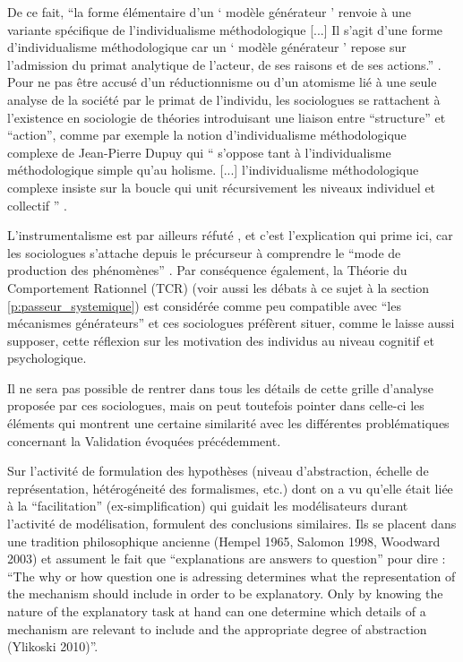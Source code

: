 De ce fait, \enquote{la forme élémentaire d’un \enquote{ modèle générateur } renvoie à une variante spécifique de l’individualisme méthodologique [...] Il s’agit d’une forme d’individualisme méthodologique car un  \enquote{ modèle générateur } repose sur l’admission du primat analytique de l’acteur, de ses raisons et de ses actions.} \autocite{Manzo2007}. Pour ne pas être accusé d'un réductionnisme ou d'un atomisme lié à une seule analyse de la société par le primat de l'individu, les sociologues se rattachent à l'existence en sociologie de théories introduisant une liaison entre \enquote{structure} et \enquote{action}, comme par exemple la notion d'individualisme méthodologique complexe de Jean-Pierre Dupuy \autocite{Dupuy2004} qui \enquote{ s’oppose tant à l’individualisme méthodologique simple qu’au holisme. [...] l’individualisme méthodologique complexe insiste sur la boucle qui unit récursivement les niveaux individuel et collectif } \autocite[9]{Manzo2007}.

L'instrumentalisme est par ailleurs réfuté  \autocite{Hedstrom2010}, et c'est l'explication qui prime ici, car les sociologues s'attache depuis le précurseur \textcite{Harre1972} à comprendre le \enquote{mode de production des phénomènes} . Par conséquence également, la Théorie du Comportement Rationnel (TCR) (voir aussi les débats à ce sujet à la section \ref{p:passeur_systemique}) est considérée comme peu compatible avec \enquote{les mécanismes générateurs} et ces sociologues préfèrent situer, comme \textcite{Conte2007} le laisse aussi supposer, cette réflexion sur les motivation des individus au niveau cognitif et psychologique.

Il ne sera pas possible de rentrer dans tous les détails de cette grille d'analyse proposée par ces sociologues, mais on peut toutefois pointer dans celle-ci les éléments qui montrent une certaine similarité avec les différentes problématiques concernant la Validation évoquées précédemment.

Sur l'activité de formulation des hypothèses (niveau d'abstraction, échelle de représentation, hétérogéneité des formalismes, etc.) dont on a vu qu'elle était liée à la \enquote{facilitation} (ex-simplification) qui guidait les modélisateurs durant l'activité de modélisation, \textcite{Hedstrom2010} formulent des conclusions similaires. Ils se placent dans une tradition philosophique ancienne (Hempel 1965, Salomon 1998, Woodward 2003) et assument le fait que \foreignquote{english}{explanations are answers to question} pour dire : \foreignquote{english}{The why or how question one is adressing determines what the representation of the mechanism should include in order to be explanatory. Only by knowing the nature of the explanatory task at hand can one determine which details of a mechanism are relevant to include and the appropriate degree of abstraction (Ylikoski 2010)}.

